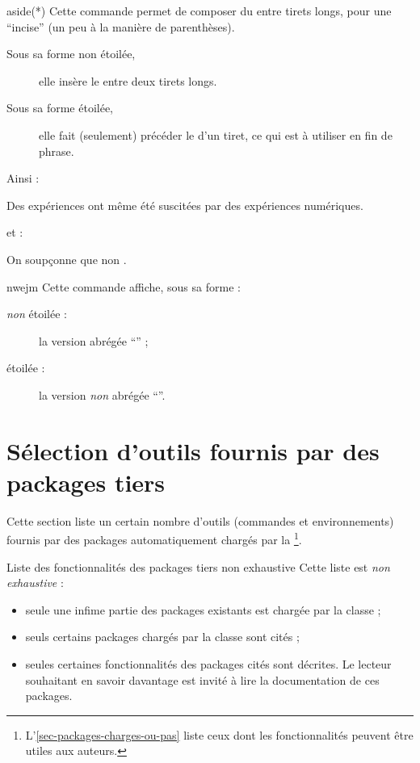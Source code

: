 \documentclass[english,nolocaltoc]{nwejmart}
\newtheorem[style=definition]{fait}
\newtheorem[title=expérience]{experience}
\newtheorem[title-plural=anneaux]{anneau}
\newtheorem[title=idéal,title-plural=idéaux]{ideal}
\begin{document}
\begin{docCommand}{aside(*)}{}
  Cette commande permet de composer du  entre tirets longs, pour une
  \enquote{incise} (un peu à la manière de parenthèses).
  \begin{description}
  \item[Sous sa forme non étoilée,] elle insère le  entre deux
    tirets longs.
  \item[Sous sa forme étoilée,] elle fait (seulement) précéder le 
    d'un tiret, ce qui est à utiliser en fin de phrase.
  \end{description}
  Ainsi :
\begin{bodycode}
Des expériences  ont même été
suscitées par des expériences numériques.
\end{bodycode}
  et :
\begin{bodycode}[listing and text,listing options={deletekeywords={exemple}}]
On soupçonne que non .
\end{bodycode}
\end{docCommand}

\begin{docCommand}{nwejm}{}
  Cette commande affiche, sous sa forme :
  \begin{description}
  \item[\emph{non} étoilée :] la version abrégée \enquote{\nwejm{}} ;
  \item[étoilée :] la version \emph{non} abrégée \enquote{\nwejm*{}}.
  \end{description}
\end{docCommand}

\section{Sélection d'outils fournis par des packages tiers}

Cette section liste un certain nombre d'outils (commandes et environnements)
fournis par des packages automatiquement chargés par la
\nwejmauthorcl\footnote{L'\vref{sec-packages-charges-ou-pas} liste ceux dont les
  fonctionnalités peuvent être utiles aux auteurs.}.

\begin{dbwarning}{Liste des fonctionnalités des packages tiers non exhaustive}{}
  Cette liste est \emph{non exhaustive} :
  \begin{itemize}
  \item seule une infime partie des packages existants est chargée par la
    classe ;
  \item seuls certains packages chargés par la classe sont cités ;
  \item seules certaines fonctionnalités des packages cités sont décrites. Le
    lecteur souhaitant en savoir davantage est invité à lire la documentation de
    ces packages.
  \end{itemize}
\end{dbwarning}
\end{document}
